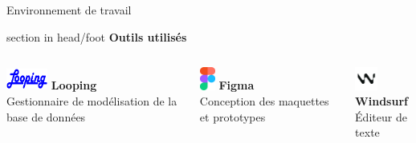 \documentclass{beamer}
\begin{document}
\begin{frame}[label=environnement]{Environnement de travail}
	\begin{beamercolorbox}[wd=\paperwidth,ht=1.5em,dp=0.5em,leftskip=0.5cm]{section in head/foot}
  		\large \textbf{Outils utilisés}
	\end{beamercolorbox}
	\vspace{0.5em}
	\begin{center}
  		\begin{minipage}{0.9\textwidth}
  			\begin{columns}[T, onlytextwidth]
        				
        				\begin{minipage}[t][2cm][t]{\linewidth}
        					\raggedright
         				\includegraphics[width=1.35cm, height=0.75cm, keepaspectratio]{../img/logo_looping.png} 
         				\hspace{0.1cm} \textbf{Looping} \\ 
         				Gestionnaire de modélisation de la base de données
          		  	\end{minipage}
          			\vspace{0.7em}
          			\pause
          			
        				\begin{minipage}[t][2cm][t]{\linewidth}
        					\raggedright
          				\includegraphics[height=0.75cm]{../img/logo_figma.png}
          				\hspace{0.95cm} \textbf{Figma} \\
          				Conception des maquettes et prototypes
          			\end{minipage}
          			\vspace{0.7em}
          			\pause
          		
          			\begin{minipage}[t][2cm][t]{\linewidth}
          				\raggedright
          				\includegraphics[width=0.75cm, height=0.75cm]{../img/logo_windsurf.png}
          				\hspace{0.6cm} \textbf{Windsurf} \\ 
          				Éditeur de texte
          			\end{minipage}
          			\pause
          			

\end{columns}
\end{minipage}
\end{center}
\end{frame}
\end{document}
